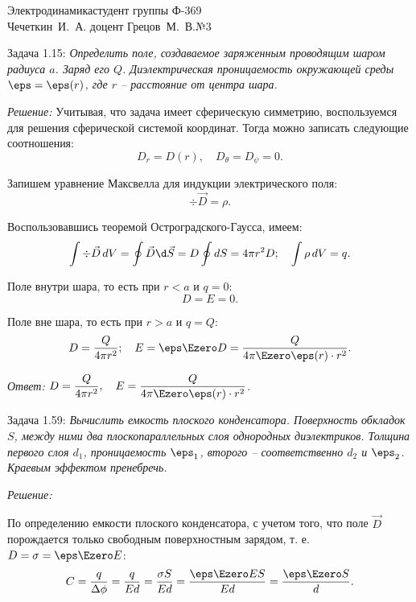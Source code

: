 





\newcommand{\ds}{\displaystyle}


{Электродинамика}{студент группы Ф-369\\Чечеткин~И.~А.}
{доцент Грецов~М.~В.}{№3}

Задача 1.15: \emph{Определить поле, создаваемое заряженным проводящим шаром
радиуса \( a \). Заряд его \( Q \). Диэлектрическая проницаемость окружающей
среды \( \eps = \eps(r) \), где \( r \) -- расстояние от центра шара.}

\vspace*{2em}
\emph{Решение:}
Учитывая, что задача имеет сферическую симметрию, воспользуемся для решения
сферической системой координат. Тогда можно записать следующие соотношения:
\[
	D_r = D(r), \quad D_\theta = D_\psi = 0.
\]

Запишем уравнение Максвелла для индукции электрического поля:
\[
	\div{\vec{D}} = \rho.
\]

Воспользовавшись теоремой Остроградского-Гаусса, имеем:
\[
	\int \div\vec{D}\,dV = \oint \vec{D}\d\vec{S} = D \oint dS = 4\pi r^2 D; \quad
	\int \rho\,dV = q.
\]

Поле внутри шара, то есть при \( r < a \) и \( q = 0 \):
\[
	D = E = 0.
\]

Поле вне шара, то есть при \( r > a \) и \( q = Q \):
\[
	D = \frac{Q}{4\pi r^2}; \quad
	E = \eps\Ezero D = \frac{Q}{4\pi\Ezero\eps(r) \cdot r^2}.
\]

\vspace*{2em}   
\emph{Ответ:} \( \ds D = \frac{Q}{4\pi r^2}, \quad
E = \frac{Q}{4\pi\Ezero\eps(r) \cdot r^2} \).

\newpage
Задача 1.59: \emph{Вычислить емкость плоского конденсатора. Поверхность
обкладок \( S \), между ними два плоскопараллельных слоя однородных
диэлектриков. Толщина первого слоя \( d_1 \), проницаемость \( \eps_1 \),
второго -- соответственно \( d_2 \) и \( \eps_2 \). Краевым эффектом
пренебречь.}

\vspace*{2em}
\emph{Решение:}

По определению емкости плоского конденсатора, с учетом того, что поле
\( \vec{D} \) порождается только свободным поверхностным зарядом, т. е.
\( D = \sigma = \eps\Ezero E\):
\[
    C = \frac{q}{\Delta\phi} = \frac{q}{Ed} = \frac{\sigma S}{Ed} =
    \frac{\eps\Ezero ES}{Ed} = \frac{\eps\Ezero S}{d}.
\]

